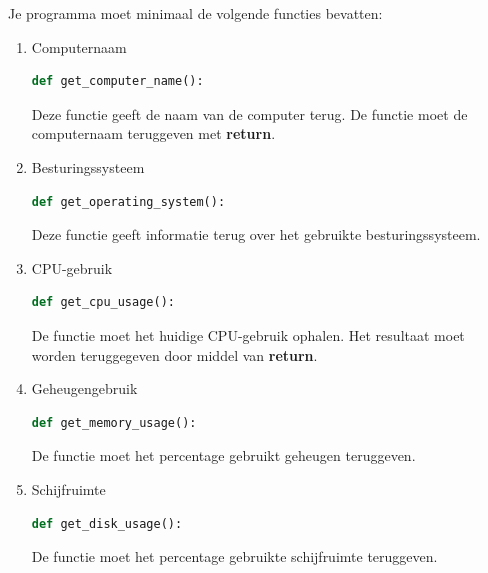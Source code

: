 Je programma moet minimaal de volgende functies bevatten:
\begin{enumerate}

\item Computernaam
\begin{lstlisting}[language=Python]
def get_computer_name():
\end{lstlisting}

Deze functie geeft de naam van de computer terug. De functie moet de computernaam teruggeven met \textbf{return}.

\item Besturingssysteem
\begin{lstlisting}[language=Python]
def get_operating_system():
\end{lstlisting}

Deze functie geeft informatie terug over het gebruikte besturingssysteem.

\item CPU-gebruik
\begin{lstlisting}[language=Python]
def get_cpu_usage():
\end{lstlisting}

De functie moet het huidige CPU-gebruik ophalen. Het resultaat moet worden teruggegeven door middel van \textbf{return}.

\item Geheugengebruik
\begin{lstlisting}[language=Python]
def get_memory_usage():
\end{lstlisting}

De functie moet het percentage gebruikt geheugen teruggeven.

\item Schijfruimte
\begin{lstlisting}[language=Python]
def get_disk_usage():
\end{lstlisting}

De functie moet het percentage gebruikte schijfruimte teruggeven.

\end{enumerate}
